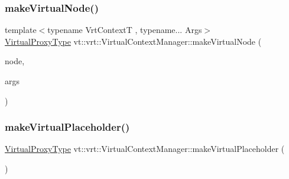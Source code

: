 \subsubsection{\texorpdfstring{make\+Virtual\+Node()}{makeVirtualNode()}}
{\footnotesize\ttfamily template$<$typename Vrt\+ContextT , typename... Args$>$ \\
\hyperlink{namespacevt_a1b417dd5d684f045bb58a0ede70045ac}{Virtual\+Proxy\+Type} vt\+::vrt\+::\+Virtual\+Context\+Manager\+::make\+Virtual\+Node (\begin{DoxyParamCaption}\item[{\hyperlink{namespacevt_a866da9d0efc19c0a1ce79e9e492f47e2}{Node\+Type} const \&}]{node,  }\item[{Args \&\&...}]{args }\end{DoxyParamCaption})}

\mbox{\label{structvt_1_1vrt_1_1_virtual_context_manager_ae3cb983e08d10e841b85782ada02967d}} 
\subsubsection{\texorpdfstring{make\+Virtual\+Placeholder()}{makeVirtualPlaceholder()}}
{\footnotesize\ttfamily \hyperlink{namespacevt_a1b417dd5d684f045bb58a0ede70045ac}{Virtual\+Proxy\+Type} vt\+::vrt\+::\+Virtual\+Context\+Manager\+::make\+Virtual\+Placeholder (\begin{DoxyParamCaption}{ }\end{DoxyParamCaption})\hspace{0.3cm}{\ttfamily [private]}}

\mbox{\label{structvt_1_1vrt_1_1_virtual_context_manager_a7236496fc6ffb6f4b9631a5024008178}} 
